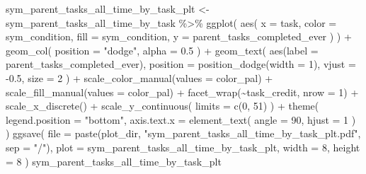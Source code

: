\documentclass[
]{book}
\newenvironment{Shaded}{\begin{snugshade}}{\end{snugshade}}
\newcommand{\AttributeTok}[1]{\textcolor[rgb]{0.77,0.63,0.00}{#1}}
\newcommand{\DecValTok}[1]{\textcolor[rgb]{0.00,0.00,0.81}{#1}}
\newcommand{\FloatTok}[1]{\textcolor[rgb]{0.00,0.00,0.81}{#1}}
\newcommand{\FunctionTok}[1]{\textcolor[rgb]{0.00,0.00,0.00}{#1}}
\newcommand{\NormalTok}[1]{#1}
\newcommand{\OtherTok}[1]{\textcolor[rgb]{0.56,0.35,0.01}{#1}}
\newcommand{\SpecialCharTok}[1]{\textcolor[rgb]{0.00,0.00,0.00}{#1}}
\newcommand{\StringTok}[1]{\textcolor[rgb]{0.31,0.60,0.02}{#1}}
\begin{document}
\begin{Shaded}
\begin{Highlighting}[]
\NormalTok{sym\_parent\_tasks\_all\_time\_by\_task\_plt }\OtherTok{\textless{}{-}}\NormalTok{ sym\_parent\_tasks\_all\_time\_by\_task }\SpecialCharTok{\%\textgreater{}\%}
  \FunctionTok{ggplot}\NormalTok{(}
    \FunctionTok{aes}\NormalTok{(}
      \AttributeTok{x =}\NormalTok{ task,}
      \AttributeTok{color =}\NormalTok{ sym\_condition,}
      \AttributeTok{fill =}\NormalTok{ sym\_condition,}
      \AttributeTok{y =}\NormalTok{ parent\_tasks\_completed\_ever}
\NormalTok{    )}
\NormalTok{  ) }\SpecialCharTok{+}
  \FunctionTok{geom\_col}\NormalTok{(}
    \AttributeTok{position =} \StringTok{"dodge"}\NormalTok{,}
    \AttributeTok{alpha =} \FloatTok{0.5}
\NormalTok{  ) }\SpecialCharTok{+}
  \FunctionTok{geom\_text}\NormalTok{(}
    \FunctionTok{aes}\NormalTok{(}\AttributeTok{label =}\NormalTok{ parent\_tasks\_completed\_ever),}
    \AttributeTok{position =} \FunctionTok{position\_dodge}\NormalTok{(}\AttributeTok{width =} \DecValTok{1}\NormalTok{),}
    \AttributeTok{vjust =} \SpecialCharTok{{-}}\FloatTok{0.5}\NormalTok{,}
    \AttributeTok{size =} \DecValTok{2}
\NormalTok{  ) }\SpecialCharTok{+}
  \FunctionTok{scale\_color\_manual}\NormalTok{(}\AttributeTok{values =}\NormalTok{ color\_pal) }\SpecialCharTok{+}
  \FunctionTok{scale\_fill\_manual}\NormalTok{(}\AttributeTok{values =}\NormalTok{ color\_pal) }\SpecialCharTok{+}
  \FunctionTok{facet\_wrap}\NormalTok{(}\SpecialCharTok{\textasciitilde{}}\NormalTok{task\_credit, }\AttributeTok{nrow =} \DecValTok{1}\NormalTok{) }\SpecialCharTok{+}
  \FunctionTok{scale\_x\_discrete}\NormalTok{() }\SpecialCharTok{+}
  \FunctionTok{scale\_y\_continuous}\NormalTok{(}
    \AttributeTok{limits =} \FunctionTok{c}\NormalTok{(}\DecValTok{0}\NormalTok{, }\DecValTok{51}\NormalTok{)}
\NormalTok{  ) }\SpecialCharTok{+}
  \FunctionTok{theme}\NormalTok{(}
    \AttributeTok{legend.position =} \StringTok{"bottom"}\NormalTok{,}
    \AttributeTok{axis.text.x =} \FunctionTok{element\_text}\NormalTok{(}
      \AttributeTok{angle =} \DecValTok{90}\NormalTok{,}
      \AttributeTok{hjust =} \DecValTok{1}
\NormalTok{    )}
\NormalTok{  )}
\FunctionTok{ggsave}\NormalTok{(}
  \AttributeTok{file =} \FunctionTok{paste}\NormalTok{(plot\_dir, }\StringTok{"sym\_parent\_tasks\_all\_time\_by\_task\_plt.pdf"}\NormalTok{, }\AttributeTok{sep =} \StringTok{"/"}\NormalTok{),}
  \AttributeTok{plot =}\NormalTok{ sym\_parent\_tasks\_all\_time\_by\_task\_plt,}
  \AttributeTok{width =} \DecValTok{8}\NormalTok{,}
  \AttributeTok{height =} \DecValTok{8}
\NormalTok{)}
\NormalTok{sym\_parent\_tasks\_all\_time\_by\_task\_plt}
\end{Highlighting}
\end{Shaded}
\end{document}
